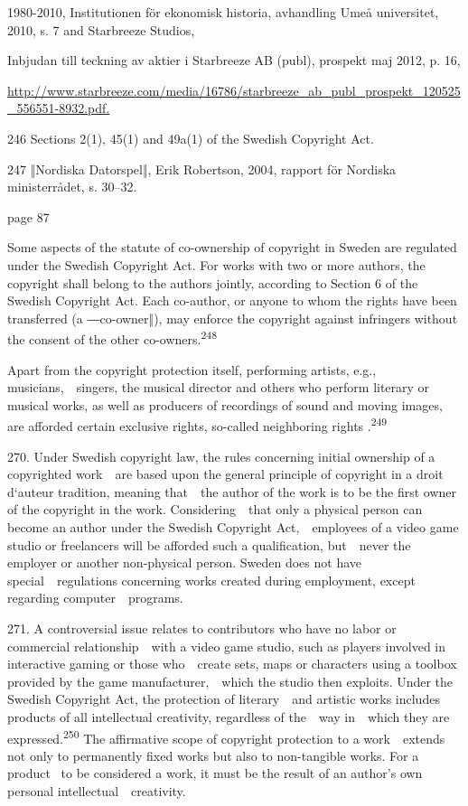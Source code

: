 \documentclass[
]{article}
\begin{document}
{1980-2010, Institutionen för ekonomisk historia, avhandling Umeå
universitet, 2010, s. 7 }{and }{Starbreeze Studios,}

{Inbjudan till teckning av aktier i Starbreeze AB (publ), prospekt maj
2012, p. 16,}

\href{http://www.starbreeze.com/media/16786/starbreeze_ab_publ_prospekt_120525_556551-8932.pdf}{{http://www.starbreeze.com/media/16786/starbreeze\_ab\_publ\_prospekt\_120525\_556551-8932.pdf.}}

{246 }{Sections 2(1), 45(1) and 49a(1) of the Swedish }{Copyright Act.}

{247 }{‖}{Nordiska Datorspel‖, }{Erik Robertson, 2004, rapport för
Nordiska ministerrådet, s. 30}{--}{32.}

{page 87}

{Some aspects of the statute of co-ownership of copyright in Sweden are
regulated under the Swedish }{Copyright Act}{. For works with two or
more authors, the copyright shall belong to the authors jointly,
according to Section 6 of the Swedish }{Copyright Act}{. Each
co-}{author, or anyone to whom the rights have been transferred (a
―co}{-}{owner‖), may }{enforce the copyright against infringers without
the consent of the other co-owners.}\textsuperscript{{248}}

{Apart from the copyright protection itself, p}{erforming artists, e.g.,
musicians,~~singers, the musical director and others who perform
literary or musical works, as well as producers of recordings of sound
and moving images, are afforded certain exclusive rights, so-called
neighboring rights .}\textsuperscript{{249}}

{270. }{Under Swedish copyright law, the rules concerning initial
ownership of a copyrighted work~~are based upon the general principle of
copyright in a }{droit d`auteur }{tradition, meaning that~~the author of
the work is to be the first owner of the copyright in the work.
Considering~~that only a physical person can become an }{author }{under
the Swedish }{Copyright Act}{,~~employees of a video game studio or
freelancers will be afforded such a qualification, but~~never the
employer or another non-physical person. Sweden does not have
special~~regulations concerning works created during employment, except
regarding computer~~programs.}

{271. }{A controversial issue relates to contributors who have no labor
or commercial relationship~~with a video game studio, such as players
involved in interactive gaming or those who~~create sets, maps or
characters using a toolbox provided by the game manufacturer,~~which the
studio then exploits. Under the Swedish }{Copyright Act}{, the
protection of literary~~and artistic works includes products of all
intellectual creativity, regardless of the~~way in~~which they are
expressed.}\textsuperscript{{250 }}{The affirmative scope of copyright
protection to a work~~extends not only to permanently fixed works but
also to non-tangible works. For a product }{~to be considered a work, it
must be the result of an author's own personal
}{intellectual~~creativity.}
\end{document}
